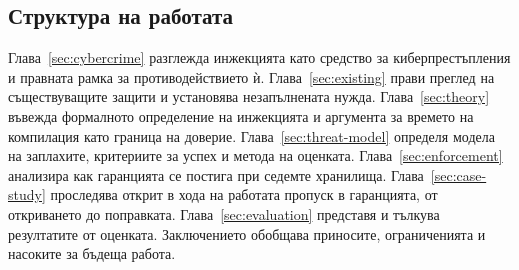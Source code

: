 \subsection*{Структура на работата}

Глава~\ref{sec:cybercrime} разглежда инжекцията като средство за
киберпрестъпления и правната рамка за противодействието ѝ.
Глава~\ref{sec:existing} прави преглед на съществуващите защити и установява
незапълнената нужда. Глава~\ref{sec:theory} въвежда формалното определение на
инжекцията и аргумента за времето на компилация като граница на доверие.
Глава~\ref{sec:threat-model} определя модела на заплахите, критериите за успех и
метода на оценката. Глава~\ref{sec:enforcement} анализира как гаранцията се
постига при седемте хранилища. Глава~\ref{sec:case-study} проследява открит в хода
на работата пропуск в гаранцията, от откриването до поправката.
Глава~\ref{sec:evaluation} представя и тълкува резултатите от оценката.
Заключението обобщава приносите, ограниченията и насоките за бъдеща работа.
